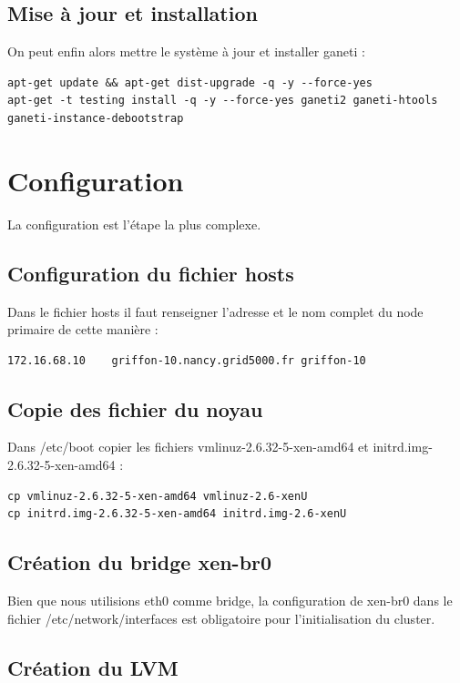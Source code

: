 \subsection {Mise à jour et installation}
On peut enfin alors mettre le système à jour et installer ganeti :

\begin{lstlisting}
apt-get update && apt-get dist-upgrade -q -y --force-yes
apt-get -t testing install -q -y --force-yes ganeti2 ganeti-htools ganeti-instance-debootstrap
\end{lstlisting}

\section {Configuration}

La configuration est l'étape la plus complexe.

\subsection {Configuration du fichier hosts}

Dans le fichier hosts il faut renseigner l'adresse et le nom complet du node primaire de cette manière :
\begin{lstlisting}
172.16.68.10    griffon-10.nancy.grid5000.fr griffon-10
\end{lstlisting}
\subsection {Copie des fichier du noyau}
Dans /etc/boot copier les fichiers vmlinuz-2.6.32-5-xen-amd64 et initrd.img-2.6.32-5-xen-amd64 :
\begin{lstlisting}
cp vmlinuz-2.6.32-5-xen-amd64 vmlinuz-2.6-xenU
cp initrd.img-2.6.32-5-xen-amd64 initrd.img-2.6-xenU
\end{lstlisting}

\subsection {Création du bridge xen-br0}

Bien que nous utilisions eth0 comme bridge, la configuration de xen-br0 dans le fichier /etc/network/interfaces est obligatoire pour l'initialisation du cluster. 

\subsection {Création du LVM}

